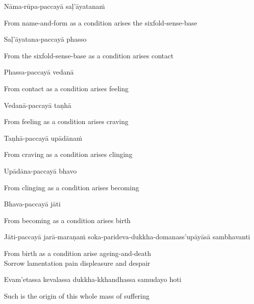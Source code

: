 Nāma-rūpa-paccayā saḷ'āyatanaṁ

\begin{english}
  From name-and-form as a condition arises the sixfold-sense-base
\end{english}

Saḷ'āyatana-paccayā phasso

\begin{english}
  From the sixfold-sense-base as a condition arises contact
\end{english}

Phassa-paccayā vedanā

\begin{english}
  From contact as a condition arises feeling
\end{english}

Vedanā-paccayā taṇhā

\begin{english}
  From feeling as a condition arises craving
\end{english}

Taṇhā-paccayā upādānaṁ

\begin{english}
  From craving as a condition arises clinging
\end{english}

Upādāna-paccayā bhavo

\begin{english}
  From clinging as a condition arises becoming
\end{english}

Bhava-paccayā jāti

\begin{english}
  From becoming as a condition arises birth
\end{english}

\begin{pali-hang}
  Jāti-paccayā jarā-maraṇaṁ soka-parideva-dukkha-domanass'upāyāsā sambhavanti
\end{pali-hang}

\begin{english}
  From birth as a condition arise ageing-and-death\\
  Sorrow lamentation pain displeasure and despair
\end{english}

Evam'etassa kevalassa dukkha-kkhandhassa samudayo hoti

\begin{english}
  Such is the origin of this whole mass of suffering
\end{english}

